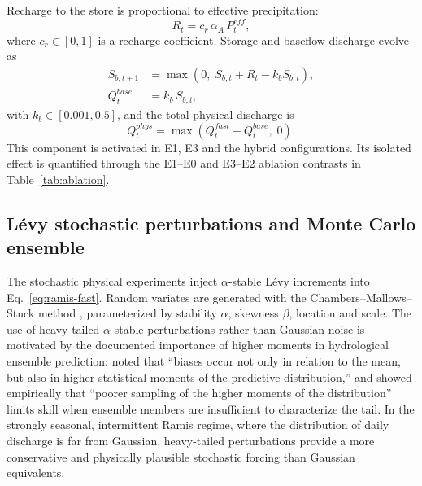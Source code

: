 \documentclass[a4paper,fleqn]{cas-sc}
\begin{document}
Recharge to the store is proportional to effective precipitation:
\begin{equation}
R_t = c_r\,\alpha_A\,P^{eff}_t,
\label{eq:recharge}
\end{equation}
where $c_r\in[0,1]$ is a recharge coefficient. Storage and baseflow
discharge evolve as
\begin{align}
S_{b,t+1} &= \max\!\left(0,\;S_{b,t} + R_t - k_b S_{b,t}\right),
\label{eq:storage}\\
Q^{base}_t &= k_b\,S_{b,t},
\label{eq:qbase}
\end{align}
with $k_b\in[0.001,0.5]$, and the total physical discharge is
\begin{equation}
Q^{phys}_t = \max\!\left(Q^{fast}_t + Q^{base}_t,\;0\right).
\label{eq:qtotal}
\end{equation}
This component is activated in E1, E3 and the hybrid configurations.
Its isolated effect is quantified through the E1--E0 and E3--E2
ablation contrasts in Table~\ref{tab:ablation}.

\subsection{L\'{e}vy stochastic perturbations and Monte Carlo ensemble}
\label{subsec:levy}

The stochastic physical experiments inject $\alpha$-stable L\'{e}vy
increments into Eq.~\ref{eq:ramis-fast}. Random variates are
generated with the Chambers--Mallows--Stuck method
\citep{chambers1976cms}, parameterized by stability $\alpha$,
skewness $\beta$, location and scale. The use of heavy-tailed
$\alpha$-stable perturbations rather than Gaussian noise is motivated
by the documented importance of higher moments in hydrological
ensemble prediction: \citet{abaza2017} noted that ``biases occur not
only in relation to the mean, but also in higher statistical moments
of the predictive distribution,'' and \citet{atger1999} showed
empirically that ``poorer sampling of the higher moments of the
distribution'' limits skill when ensemble members are insufficient to
characterize the tail. In the strongly seasonal, intermittent Ramis
regime, where the distribution of daily discharge is far from
Gaussian, heavy-tailed perturbations provide a more conservative and
physically plausible stochastic forcing than Gaussian equivalents.
\end{document}
